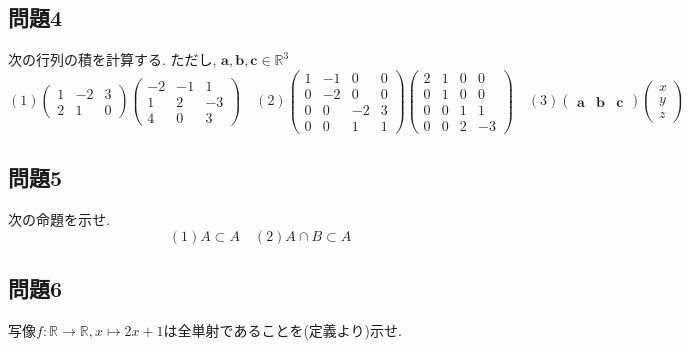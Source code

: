 \documentclass[a4j,dvipdfmx]{jsarticle}
\begin{document}
    \subsection*{問題4}
        次の行列の積を計算する. ただし, $\bm{a},\bm{b},\bm{c}\in \mathbb{R}^3$
        \begin{equation*}
            (1)\begin{pmatrix}
                1 & -2 & 3\\
                2 & 1 & 0
            \end{pmatrix}
            \begin{pmatrix}
                -2 & -1 & 1\\
                1 & 2 & -3\\
                4 & 0 & 3
            \end{pmatrix}\quad 
            (2)\begin{pmatrix}
                1 & -1 & 0 & 0\\
                0 & -2 & 0 & 0\\
                0 & 0  & -2 & 3\\
                0 & 0  & 1 & 1
            \end{pmatrix}
            \begin{pmatrix}
                2 & 1 & 0 & 0\\
                0 & 1 & 0 & 0\\
                0 & 0  & 1 & 1\\
                0 & 0  & 2 & -3
            \end{pmatrix}\quad
            (3)\begin{pmatrix}
                \bm{a} & \bm{b} & \bm{c}
            \end{pmatrix}
            \begin{pmatrix}
                x\\
                y\\
                z
            \end{pmatrix}
        \end{equation*}
    \subsection*{問題5}
        次の命題を示せ.
        \begin{equation*}
            (1)A\subset A \quad (2)A\cap B\subset A
        \end{equation*}
    \subsection*{問題6}
        写像$f:\mathbb{R}\to\mathbb{R}, x\mapsto 2x+1$は全単射であることを(定義より)示せ.
\end{document}

